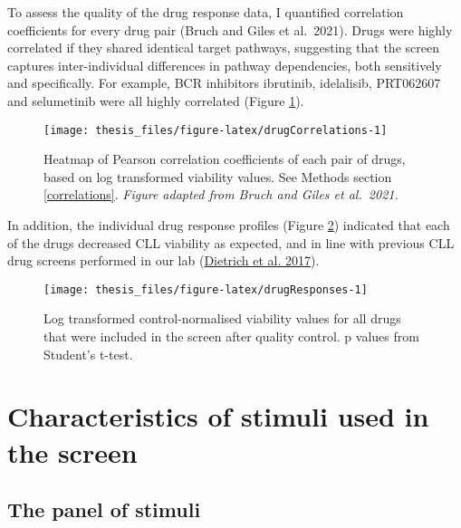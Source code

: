 \documentclass[11pt, a4paper, twosided]{book}
\begin{document}
To assess the quality of the drug response data, I quantified correlation coefficients for every drug pair (Bruch and Giles et al.~2021). Drugs were highly correlated if they shared identical target pathways, suggesting that the screen captures inter-individual differences in pathway dependencies, both sensitively and specifically. For example, BCR inhibitors ibrutinib, idelalisib, PRT062607 and selumetinib were all highly correlated (Figure \ref{fig:drugCorrelations}).


\begin{figure}

{\centering \texttt{[image: thesis\_files/figure-latex/drugCorrelations-1]} 

}

\caption{Heatmap of Pearson correlation coefficients of each pair of drugs, based on log transformed viability values. See Methods section \ref{correlations}. \emph{Figure adapted from Bruch and Giles et al.~2021.}}\label{fig:drugCorrelations}
\end{figure}
In addition, the individual drug response profiles (Figure \ref{fig:drugResponses}) indicated that each of the drugs decreased CLL viability as expected, and in line with previous CLL drug screens performed in our lab (\protect\hyperlink{ref-JCIpaper}{Dietrich et al. 2017}).


\begin{figure}

{\centering \texttt{[image: thesis\_files/figure-latex/drugResponses-1]} 

}

\caption{Log transformed control-normalised viability values for all drugs that were included in the screen after quality control. p values from Student's t-test.}\label{fig:drugResponses}
\end{figure}
\hypertarget{stimuli}{%
\section{Characteristics of stimuli used in the screen}\label{stimuli}}

\hypertarget{stimuli-info}{%
\subsection{The panel of stimuli}\label{stimuli-info}}
\end{document}
